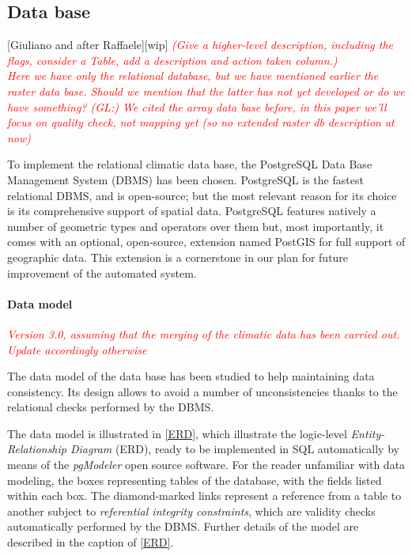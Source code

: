 \documentclass[authoryear,preprint,review,12pt]{elsarticle}
\newcommand{\note}[1]{\emph{\textcolor{red}{#1}}}
\begin{document}
\subsection{Data base}[Giuliano and after Raffaele][wip]
\note{(Give a higher-level description, including the flags, consider a Table, add a description and action taken column.)}\\
\note{Here we have only the relational database, but we have mentioned earlier the raster data base. Should we mention that the latter has not yet developed or do we have something? (GL:) We cited the array data base before, in this paper we'll focus on quality check, not mapping yet (so no extended raster db description at now)}

To implement the relational climatic data base, the PostgreSQL Data Base Management System (DBMS) \citep{postgres:postgresql} has been chosen. PostgreSQL is the fastest relational DBMS, and is open-source; but the most relevant reason for its choice is its comprehensive support of spatial data. PostgreSQL features natively a number of geometric types and operators over them but, most importantly, it comes with an optional, open-source, extension named PostGIS  \citep{postgis:postgis} for full support of geographic data. This extension is a cornerstone in our plan for future improvement of the automated system.

\paragraph{Data model}
\note{Version 3.0, assuming that the merging of the climatic data has been carried out. Update accordingly otherwise}

The data model of the data base has been studied to help maintaining data consistency. Its design allows to avoid a number of unconsistencies thanks to the relational checks performed by the DBMS. 

The data model is illustrated in  \cref{ERD}, which illustrate the logic-level \emph{Entity-Relationship Diagram} (ERD), ready to be implemented in SQL automatically by means of the \emph{pgModeler} \citep{silva:pgmodeler} open source software. For the reader unfamiliar with data modeling, the boxes representing tables of the database, with the fields listed within each box. The diamond-marked links represent a reference from a table to another subject to \emph{referential integrity constraints}, which are validity checks automatically performed by the DBMS. Further details of the model are described in the caption of \cref{ERD}.
\end{document}
